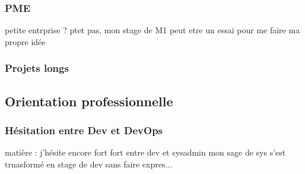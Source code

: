 \subsubsection{PME}
petite entrprise ? ptet pas, mon stage de M1 peut etre un essai pour me faire ma propre idée

\subsubsection{Projets longs}


\subsection{Orientation professionnelle}
\subsubsection{Hésitation entre Dev et DevOps}
matière : j'hésite encore fort fort entre dev et sysadmin
mon sage de sys s'est trnasformé en stage de dev sans faire expres...
